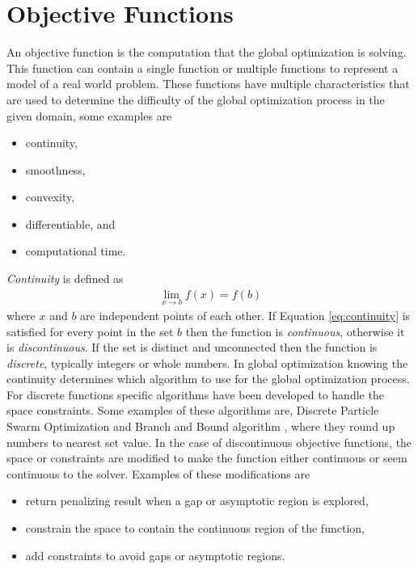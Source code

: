 \section{Objective Functions}
An objective function is the computation that the global optimization is solving. This function can contain a single function or multiple functions to represent a model of a real world problem. These functions have multiple characteristics that are used to determine the difficulty of the global optimization process in the given domain, some examples are
\begin{itemize}
  \item continuity,
  \item smoothness,
  \item convexity,
  \item differentiable, and
  \item computational time.
\end{itemize}
\textit{Continuity} is defined as  
\begin{align}
  \label{eq:continuity}
  \lim_{x\rightarrow b} f(x) = f(b)
\end{align}
where $x$ and $b$ are independent points of each other. If Equation \ref{eq:continuity} is satisfied for every point in the set $b$ then the function is \textit{continuous}, otherwise it is \textit{discontinuous}. If the set is distinct and unconnected then the function is \textit{discrete}, typically integers or whole numbers. In global optimization knowing the continuity determines which algorithm to use for the global optimization process. For discrete functions
specific algorithms have been developed to handle the space constraints. Some examples of these algorithms are, Discrete Particle Swarm Optimization \cite{Kaveh2014} and Branch and Bound algorithm \cite{Liberti2000}, where they round up numbers to nearest set value. In the case of discontinuous objective functions, the space or constraints are modified to make the function either continuous or seem continuous to the solver. Examples of these modifications are
\begin{itemize}
    \item return penalizing result when a gap or asymptotic region is explored,
    \item constrain the space to contain the continuous region of the function,
    \item add constraints to avoid gaps or asymptotic regions.
\end{itemize}

